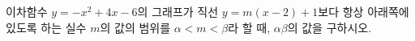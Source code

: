 이차함수 $y=-x^2+4x-6$의 그래프가 직선 $y=m(x-2)+1$보다 항상 아래쪽에 있도록 하는 실수 $m$의 값의 범위를 $\alpha<m<\beta$라 할 때, $\alpha\beta$의 값을 구하시오.
